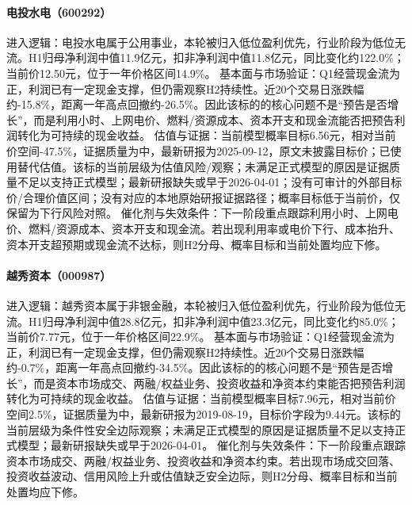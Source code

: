\paragraph{电投水电（600292）}
进入逻辑：电投水电属于公用事业，本轮被归入低位盈利优先，行业阶段为低位无流。H1归母净利润中值11.9亿元，扣非净利润中值11.8亿元，同比变化约122.0\%；当前价12.50元，位于一年价格区间14.9\%。
基本面与市场验证：Q1经营现金流为正，利润已有一定现金支撑，但仍需观察H2持续性。近20个交易日涨跌幅约-15.8\%，距离一年高点回撤约-26.5\%。因此该标的的核心问题不是“预告是否增长”，而是利用小时、上网电价、燃料/资源成本、资本开支和现金流能否把预告利润转化为可持续的现金收益。
估值与证据：当前模型概率目标6.56元，相对当前价空间-47.5\%，证据质量为中，最新研报为2025-09-12，原文未披露目标价；已使用替代估值。该标的当前层级为估值风险/观察；未满足正式模型的原因是证据质量不足以支持正式模型；最新研报缺失或早于2026-04-01；没有可审计的外部目标价/合理价值区间；没有对应的本地原始研报证据路径；概率目标低于当前价，仅保留为下行风险对照。
催化剂与失效条件：下一阶段重点跟踪利用小时、上网电价、燃料/资源成本、资本开支和现金流。若出现利用率或电价下行、成本抬升、资本开支超预期或现金流不达标，则H2分母、概率目标和当前处置均应下修。

\paragraph{越秀资本（000987）}
进入逻辑：越秀资本属于非银金融，本轮被归入低位盈利优先，行业阶段为低位无流。H1归母净利润中值28.8亿元，扣非净利润中值23.3亿元，同比变化约85.0\%；当前价7.77元，位于一年价格区间22.9\%。
基本面与市场验证：Q1经营现金流为正，利润已有一定现金支撑，但仍需观察H2持续性。近20个交易日涨跌幅约-0.7\%，距离一年高点回撤约-34.5\%。因此该标的的核心问题不是“预告是否增长”，而是资本市场成交、两融/权益业务、投资收益和净资本约束能否把预告利润转化为可持续的现金收益。
估值与证据：当前模型概率目标7.96元，相对当前价空间2.5\%，证据质量为中，最新研报为2019-08-19，目标价字段为9.44元。该标的当前层级为条件性安全边际观察；未满足正式模型的原因是证据质量不足以支持正式模型；最新研报缺失或早于2026-04-01。
催化剂与失效条件：下一阶段重点跟踪资本市场成交、两融/权益业务、投资收益和净资本约束。若出现市场成交回落、投资收益波动、信用风险上升或估值缺乏安全边际，则H2分母、概率目标和当前处置均应下修。

